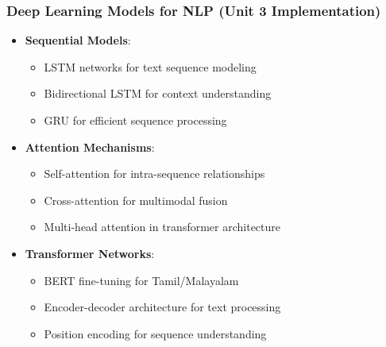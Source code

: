\documentclass{beamer}
\begin{document}
\begin{frame}
\frametitle{Deep Learning Models for NLP (Unit 3 Implementation)}
\begin{itemize}
    \item \textbf{Sequential Models}:
    \begin{itemize}
        \item LSTM networks for text sequence modeling
        \item Bidirectional LSTM for context understanding
        \item GRU for efficient sequence processing
    \end{itemize}
    \item \textbf{Attention Mechanisms}:
    \begin{itemize}
        \item Self-attention for intra-sequence relationships
        \item Cross-attention for multimodal fusion
        \item Multi-head attention in transformer architecture
    \end{itemize}
    \item \textbf{Transformer Networks}:
    \begin{itemize}
        \item BERT fine-tuning for Tamil/Malayalam
        \item Encoder-decoder architecture for text processing
        \item Position encoding for sequence understanding
    \end{itemize}
\end{itemize}
\end{frame}
\end{document}
